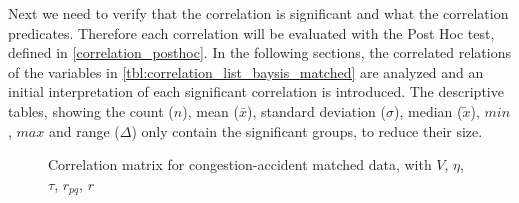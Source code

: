 Next we need to verify that the correlation is significant and what the correlation predicates. Therefore each correlation will be evaluated with the Post Hoc test, defined in \cref{correlation_posthoc}. In the following sections, the correlated relations of the variables in \cref{tbl:correlation_list_baysis_matched} are analyzed and an initial interpretation of each significant correlation is introduced. The descriptive tables, showing the count ($n$), mean ($\bar{x}$), standard deviation ($\sigma$), median ($\tilde{x}$), $min$, $max$ and range ($\Delta$)  only contain the significant groups, to reduce their size.

\begin{figure}[!ht]
	\centering
	\caption{Correlation matrix for congestion-accident matched data, with $V$, $\eta$, $\tau$, $r_{pq}$, $r$}
	\label{img:correlation_matrix_matched_cramers}
\end{figure}

